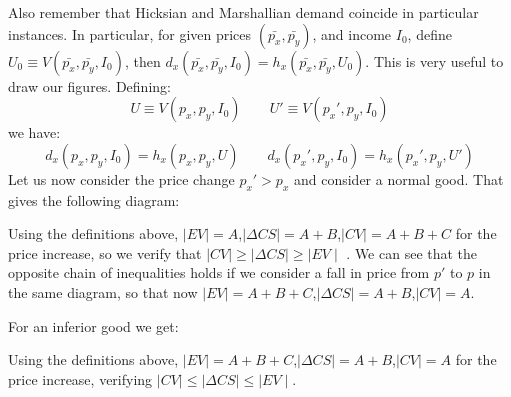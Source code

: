 \documentclass[11pt,english]{article}
\begin{document}
Also remember that Hicksian and Marshallian demand coincide in particular
instances. In particular, for given prices $\left(\bar{p_{x}},\bar{p_{y}}\right)$,
and income $I_{0}$, define $U_{0}\equiv V(\bar{p_{x}},\bar{p_{y}},I_{0})$,
then $d_{x}(\bar{p_{x}},\bar{p_{y}},I_{0})=h_{x}(\bar{p_{x}},\bar{p_{y}},U_{0})$.
This is very useful to draw our figures. Defining: 
\[
U\equiv V(p_{x},p_{y},I_{0})\qquad U'\equiv V(p_{x}',p_{y},I_{0})
\]
we have:
\[
d_{x}(p_{x},p_{y},I_{0})=h_{x}(p_{x},p_{y},U)\qquad d_{x}(p_{x}',p_{y},I_{0})=h_{x}(p_{x}',p_{y},U')
\]
Let us now consider the price change $p_{x}'>p_{x}$ and consider
a normal good. That gives the following diagram:
\FloatBarrier
\begin{figure}[!h]
\centering{}
\end{figure}
\FloatBarrier
Using the definitions above, $|EV|=A$,$|\Delta CS|=A+B$,$|CV|=A+B+C$
for the price increase, so we verify that $\mid CV\mid\geq\mid\Delta CS\mid\geq\mid EV\mid$
. We can see that the opposite chain of inequalities holds if we consider
a fall in price from $p'$ to $p$ in the same diagram, so that now
$|EV|=A+B+C$,$|\Delta CS|=A+B$,$|CV|=A$.

For an inferior good we get:
\FloatBarrier
\begin{figure}[!h]
\end{figure}
\FloatBarrier
Using the definitions above, $|EV|=A+B+C$,$|\Delta CS|=A+B$,$|CV|=A$
for the price increase, verifying $\mid CV\mid\leq\mid\Delta CS\mid\leq\mid EV\mid$.
\end{document}
